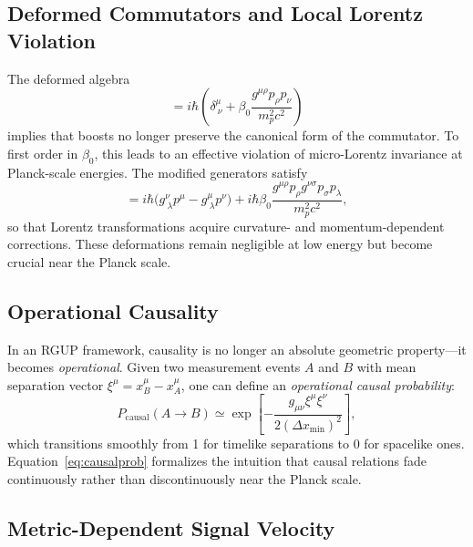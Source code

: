 \documentclass[11pt,oneside]{book}
\numberwithin{equation}{chapter}
\begin{document}
\subsection*{Deformed Commutators and Local Lorentz Violation}

The deformed algebra
\begin{equation}
[x^\mu,p_\nu] 
= i\hbar
\left(
\delta^\mu_{\ \nu}
+\beta_0
\frac{g^{\mu\rho}p_\rho p_\nu}{m_p^2 c^2}
\right)
\end{equation}
implies that boosts no longer preserve the canonical form of the commutator.  
To first order in $\beta_0$, this leads to an effective violation of micro-Lorentz invariance at Planck-scale energies.  
The modified generators satisfy
\begin{equation}
[J^{\mu\nu},p_\lambda]
= i\hbar\big(
g^{\nu}_{\ \lambda}p^\mu - g^{\mu}_{\ \lambda}p^\nu
\big)
+ i\hbar\beta_0
\frac{g^{\mu\rho}p_\rho g^{\nu\sigma}p_\sigma p_\lambda}{m_p^2 c^2},
\label{eq:lorentzmod}
\end{equation}
so that Lorentz transformations acquire curvature- and momentum-dependent corrections.  
These deformations remain negligible at low energy but become crucial near the Planck scale.

\subsection*{Operational Causality}

In an RGUP framework, causality is no longer an absolute geometric property—it becomes \emph{operational}.  
Given two measurement events \(A\) and \(B\) with mean separation vector \( \xi^\mu = x_B^\mu - x_A^\mu \), one can define an \emph{operational causal probability}:
\begin{equation}
P_{\text{causal}}(A\!\rightarrow\!B)
\simeq
\exp\!\left[
-\frac{g_{\mu\nu}\xi^\mu\xi^\nu}{2(\Delta x_{\min})^2}
\right],
\label{eq:causalprob}
\end{equation}
which transitions smoothly from 1 for timelike separations to 0 for spacelike ones.  
Equation~\eqref{eq:causalprob} formalizes the intuition that causal relations fade continuously rather than discontinuously near the Planck scale.

\subsection*{Metric-Dependent Signal Velocity}
\end{document}
